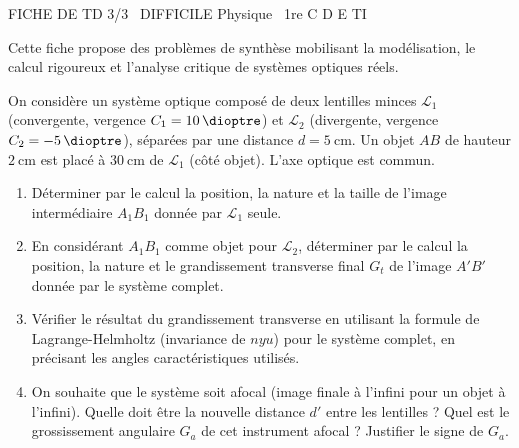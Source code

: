 \documentclass[11pt]{article}
\begin{document}
\begin{tcolorbox}[enhanced,colback=popink,colframe=popink,arc=10pt,boxrule=0pt,left=12pt,right=12pt,top=9pt,bottom=9pt]
{\color{white}\popxbold\small FICHE DE TD 3/3 \textbullet\ DIFFICILE \hfill Physique \textbullet\ 1re C D E TI\par}
\end{tcolorbox}
\vspace{4pt}
Cette fiche propose des problèmes de synthèse mobilisant la modélisation, le calcul rigoureux et l'analyse critique de systèmes optiques réels.

\begin{exercice}
On considère un système optique composé de deux lentilles minces $\mathcal{L}_1$ (convergente, vergence $C_1 = \SI{+10}{\dioptre}$) et $\mathcal{L}_2$ (divergente, vergence $C_2 = \SI{-5}{\dioptre}$), séparées par une distance $d = \SI{5}{\centi\metre}$. Un objet $AB$ de hauteur $\SI{2}{\centi\metre}$ est placé à $\SI{30}{\centi\metre}$ de $\mathcal{L}_1$ (côté objet). L'axe optique est commun.
\begin{enumerate}
    \item Déterminer par le calcul la position, la nature et la taille de l'image intermédiaire $A_1B_1$ donnée par $\mathcal{L}_1$ seule.
    \item En considérant $A_1B_1$ comme objet pour $\mathcal{L}_2$, déterminer par le calcul la position, la nature et le grandissement transverse final $G_t$ de l'image $A'B'$ donnée par le système complet.
    \item Vérifier le résultat du grandissement transverse en utilisant la formule de Lagrange-Helmholtz (invariance de $n y u$) pour le système complet, en précisant les angles caractéristiques utilisés.
    \item On souhaite que le système soit afocal (image finale à l'infini pour un objet à l'infini). Quelle doit être la nouvelle distance $d'$ entre les lentilles ? Quel est le grossissement angulaire $G_a$ de cet instrument afocal ? Justifier le signe de $G_a$.
\end{enumerate}
\end{exercice}
\end{document}
